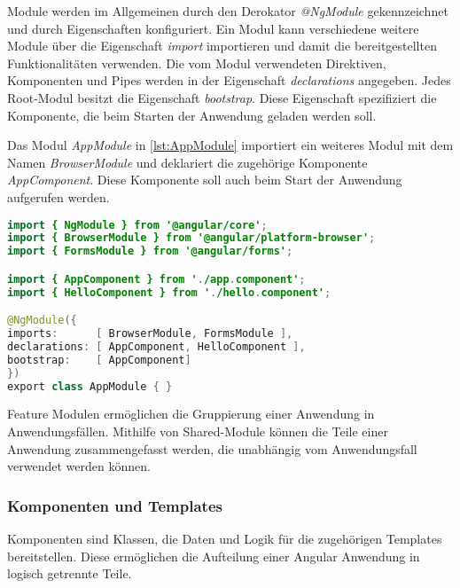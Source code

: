 Module werden im Allgemeinen durch den Derokator \textit{@NgModule} gekennzeichnet und durch Eigenschaften konfiguriert. Ein Modul kann verschiedene weitere Module über die Eigenschaft \textit{import} importieren und damit die bereitgestellten Funktionalitäten verwenden. Die vom Modul verwendeten Direktiven, Komponenten und Pipes werden in der Eigenschaft \textit{declarations} angegeben. Jedes Root-Modul besitzt die Eigenschaft \textit{bootstrap}. Diese Eigenschaft spezifiziert die Komponente, die beim Starten der Anwendung geladen werden soll. 

Das Modul \textit{AppModule} in \autoref{lst:AppModule} importiert ein weiteres Modul mit dem Namen \textit{BrowserModule} und deklariert die zugehörige Komponente \textit{AppComponent}. Diese Komponente soll auch beim Start der Anwendung aufgerufen werden.

\begin{lstlisting}[caption=Das Root-Module in der Datei app.module.ts, label=lst:AppModule, language=Java]
import { NgModule } from '@angular/core';
import { BrowserModule } from '@angular/platform-browser';
import { FormsModule } from '@angular/forms';

import { AppComponent } from './app.component';
import { HelloComponent } from './hello.component';

@NgModule({
imports:      [ BrowserModule, FormsModule ],
declarations: [ AppComponent, HelloComponent ],
bootstrap:    [ AppComponent]
})
export class AppModule { }

\end{lstlisting}

Feature Modulen ermöglichen die Gruppierung einer Anwendung in Anwendungsfällen. Mithilfe von Shared-Module können die Teile einer Anwendung zusammengefasst werden, die unabhängig vom Anwendungsfall verwendet werden können. \autocites[vgl.][528\psqq]{Freeman.2018}[vgl.][]{Google.c}[vgl.][105\psqq]{Steyer.2017}

\subsubsection{Komponenten und Templates}


Komponenten sind Klassen, die Daten und Logik für die zugehörigen Templates bereitstellen. Diese ermöglichen die Aufteilung einer Angular Anwendung in logisch getrennte Teile. \autocite[vgl.][401]{Freeman.2018} 

